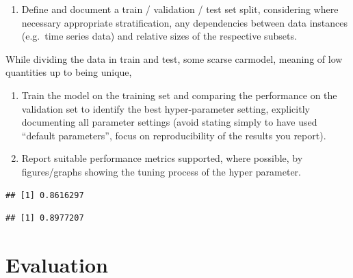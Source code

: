 \documentclass[sigchi]{acmart}
\def\tightlist{}
\newenvironment{Shaded}{\begin{snugshade}}{\end{snugshade}}
\newcommand{\CommentTok}[1]{\textcolor[rgb]{0.56,0.35,0.01}{\textit{#1}}}
\newcommand{\KeywordTok}[1]{\textcolor[rgb]{0.13,0.29,0.53}{\textbf{#1}}}
\newcommand{\NormalTok}[1]{#1}
\newcommand{\OperatorTok}[1]{\textcolor[rgb]{0.81,0.36,0.00}{\textbf{#1}}}
\begin{document}
\begin{enumerate}
\def\labelenumi{\alph{enumi}.}
\setcounter{enumi}{2}
\tightlist
\item
  Define and document a train / validation / test set split, considering where necessary appropriate stratification, any dependencies between data instances (e.g.~time series data) and relative sizes of the respective subsets.
\end{enumerate}

While dividing the data in train and test, some scarse carmodel, meaning of low quantities up to being unique,

\begin{enumerate}
\def\labelenumi{\alph{enumi}.}
\setcounter{enumi}{3}
\item
  Train the model on the training set and comparing the performance on the validation set to identify the best hyper-parameter setting, explicitly documenting all parameter settings (avoid stating simply to have used ``default parameters'', focus on reproducibility of the results you report).
\item
  Report suitable performance metrics supported, where possible, by figures/graphs showing the tuning process of the hyper parameter.
\end{enumerate}

\begin{Shaded}
\end{Shaded}

\begin{verbatim}
## [1] 0.8616297
\end{verbatim}

\begin{Shaded}
\end{Shaded}

\begin{verbatim}
## [1] 0.8977207
\end{verbatim}

\hypertarget{evaluation}{%
\section{Evaluation}\label{evaluation}}
\end{document}
